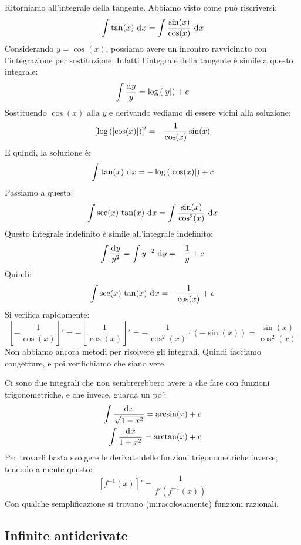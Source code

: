 Ritorniamo all'integrale della tangente. Abbiamo visto come pu\`o riscriversi:
\[
\int \tan (x) \dx = \int \frac{\sin (x)}{\cos (x)} \dx
\]
Considerando $y = \cos(x)$, possiamo avere un incontro ravvicinato con l'integrazione per sostituzione. Infatti l'integrale della tangente \`e simile a questo integrale:
\[
\int \frac{\diff y}{y} = \abslog{y} + c 
\]
Sostituendo $\cos (x)$ alla $y$ e derivando vediamo di essere vicini alla soluzione:
\[
\left[ \log \left( \left\lvert{\cos(x)}\right\rvert \right) \right]' = - \frac{1}{\cos(x)} \sin (x)
\]
E quindi, la soluzione \`e:
\[
\int \tan (x) \dx = - \abslog{ \cos(x) } + c
\]
Passiamo a questa:
\[
\int \sec (x) \, \tan (x) \dx = \int \frac{\sin(x)}{\cos^2(x)} \dx
\]
Questo integrale indefinito \`e simile all'integrale indefinito:
\[
\int \frac{\diff y}{y^2} = \int y^{-2} \dx[y] = - \frac{1}{y} + c
\]
Quindi:
\[
\int \sec (x) \, \tan (x) \dx = - \frac{1}{\cos(x)} + c
\]
Si verifica rapidamente:
\[
\left[ - \frac{1}{\cos (x)} \right]' = - \left[ \frac{1}{\cos (x)} \right]' = - \frac{1}{\cos^2 (x)} \cdot \left( - \sin (x) \right) = \frac{\sin(x)}{\cos^2(x)}
\]
Non abbiamo ancora metodi per risolvere gli integrali. Quindi facciamo congetture, e poi verifichiamo che siano vere.

Ci sono due integrali che non sembrerebbero avere a che fare con funzioni trigonometriche, e che invece, guarda un po':
\begin{align*}
\int \frac{\diff x}{\sqrt{1 - x^2}} = \arcsin(x) + c \\
\int \frac{\diff x}{1 + x^2} = \arctan(x) + c
\end{align*}
Per trovarli basta svolgere le derivate delle funzioni trigonometriche inverse, tenendo a mente questo:
\[
\left[ f^{-1} (x) \right]' = \frac{1}{f' \left( f^{-1} (x) \right)}
\]
Con qualche semplificazione si trovano (miracolosamente) funzioni razionali.

\subsection{Infinite antiderivate}

